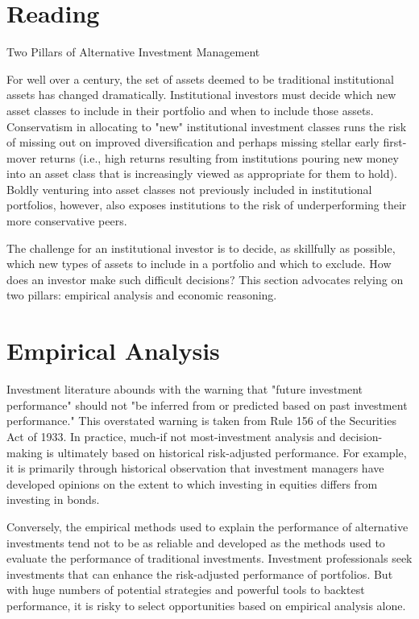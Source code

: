 \documentclass[11pt]{article}
\begin{document}
\section*{Reading}
Two Pillars of Alternative Investment Management

For well over a century, the set of assets deemed to be traditional institutional assets has changed dramatically. Institutional investors must decide which new asset classes to include in their portfolio and when to include those assets. Conservatism in allocating to "new" institutional investment classes runs the risk of missing out on improved diversification and perhaps missing stellar early first-mover returns (i.e., high returns resulting from institutions pouring new money into an asset class that is increasingly viewed as appropriate for them to hold). Boldly venturing into asset classes not previously included in institutional portfolios, however, also exposes institutions to the risk of underperforming their more conservative peers.

The challenge for an institutional investor is to decide, as skillfully as possible, which new types of assets to include in a portfolio and which to exclude. How does an investor make such difficult decisions? This section advocates relying on two pillars: empirical analysis and economic reasoning.

\section*{Empirical Analysis}
Investment literature abounds with the warning that "future investment performance" should not "be inferred from or predicted based on past investment performance." This overstated warning is taken from Rule 156 of the Securities Act of 1933. In practice, much-if not most-investment analysis and decision-making is ultimately based on historical risk-adjusted performance. For example, it is primarily through historical observation that investment managers have developed opinions on the extent to which investing in equities differs from investing in bonds.

Conversely, the empirical methods used to explain the performance of alternative investments tend not to be as reliable and developed as the methods used to evaluate the performance of traditional investments. Investment professionals seek investments that can enhance the risk-adjusted performance of portfolios. But with huge numbers of potential strategies and powerful tools to backtest performance, it is risky to select opportunities based on empirical analysis alone.
\end{document}
